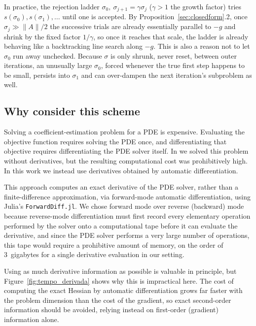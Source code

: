 \documentclass[11pt]{article}
\newcommand{\norm}[1]{\|#1\|}
\begin{document}
In practice, the rejection ladder $\sigma_0,\ \sigma_{j+1}=\gamma\sigma_j$
($\gamma>1$ the growth factor) tries $s(\sigma_0), s(\sigma_1),\dots$
until one is accepted. By Proposition~\ref{sec:closedform}.2, once $\sigma_j\gg\norm{A}/2$ the
successive trials are already essentially parallel to $-g$ and shrink by
the fixed factor $1/\gamma$, so once it reaches that scale, the ladder
is already behaving like a backtracking line search along $-g$. This is
also a reason not to let $\sigma_0$ run away unchecked. Because $\sigma$ is
only shrunk, never reset, between outer iterations, an unusually large
$\sigma_0$, forced whenever the true first step happens to be small,
persists into $\sigma_1$ and can over-dampen the next iteration's
subproblem as well.




\subsection{Why consider this scheme}

Solving a coefficient-estimation problem for a PDE is expensive.
Evaluating the objective function requires solving the PDE once, and
differentiating that objective requires differentiating the PDE solver
itself. In \cite{FortunatoMartinez2025} we solved this problem without
derivatives, but the resulting computational cost was prohibitively high.
In this work we instead use derivatives obtained by automatic
differentiation.

This approach computes an exact derivative of the PDE solver, rather than
a finite-difference approximation, via forward-mode automatic
differentiation, using Julia's \texttt{ForwardDiff.jl}. We chose forward
mode over reverse (backward) mode because reverse-mode differentiation
must first record every elementary operation performed by the solver onto
a computational tape before it can evaluate the derivative, and since the
PDE solver performs a very large number of operations, this tape would
require a prohibitive amount of memory, on the order of 3~gigabytes for a
single derivative evaluation in our setting.

Using as much derivative information as possible is valuable in
principle, but Figure~\ref{fig:tempo_derivada} shows why this is
impractical here. The cost of computing the exact Hessian by automatic
differentiation grows far faster with the problem dimension than the cost
of the gradient, so exact second-order information should be avoided,
relying instead on first-order (gradient) information alone.
\end{document}
